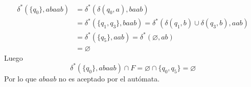 \documentclass{article}
\begin{document}
\begin{enumerate}
{\begin{itemize}
\begin{enumerate}
{\begin{itemize}
{\begin{align*}
                			\delta^{*}(\{q_{0}\}, abaab)
                			&= \delta^{*}(\delta(q_{0}, a), baab) \\
                			&= \delta^{*}(\{q_{1}, q_{3}\}, baab) 
                			= \delta^{*}(\delta(q_{1}, b) 
                			\cup \delta(q_{3}, b), aab) \\
                			&= \delta^{*}(\{q_{5} \}, aab) 
                			= \delta^{*}(\varnothing, ab)\\
                			&= \varnothing            			
                			\end{align*}
                			Luego 
                			\[\delta^{*}(\{q_{0}\}, abaab) \cap F = 
                			\varnothing \cap \{q_{0}, q_{5}\} = \varnothing\]
                			Por lo que $abaab$ no es aceptado por el 
                			autómata.\\
                		}
                	\end{itemize}
                
}
\end{enumerate}
\end{itemize}}
\end{enumerate}
\end{document}

